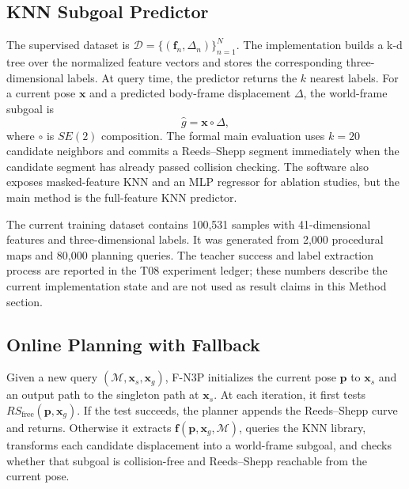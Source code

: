 \documentclass[11pt,a4paper]{article}
\begin{document}
\subsection{KNN Subgoal Predictor}
\label{sec:method_knn}

The supervised dataset is $\mathcal{D}=\{(\mathbf{f}_n,\Delta_n)\}_{n=1}^N$. The implementation builds a k-d tree over the normalized feature vectors and stores the corresponding three-dimensional labels. At query time, the predictor returns the $k$ nearest labels. For a current pose $\mathbf{x}$ and a predicted body-frame displacement $\Delta$, the world-frame subgoal is
\begin{equation}
\hat{g} = \mathbf{x}\circ \Delta,
\end{equation}
where $\circ$ is $SE(2)$ composition. The formal main evaluation uses $k=20$ candidate neighbors and commits a Reeds--Shepp segment immediately when the candidate segment has already passed collision checking. The software also exposes masked-feature KNN and an MLP regressor for ablation studies, but the main method is the full-feature KNN predictor.

The current training dataset contains 100,531 samples with 41-dimensional features and three-dimensional labels. It was generated from 2,000 procedural maps and 80,000 planning queries. The teacher success and label extraction process are reported in the T08 experiment ledger; these numbers describe the current implementation state and are not used as result claims in this Method section.

\subsection{Online Planning with Fallback}
\label{sec:method_online}

Given a new query $(\mathcal{M},\mathbf{x}_s,\mathbf{x}_g)$, F-N3P initializes the current pose $\mathbf{p}$ to $\mathbf{x}_s$ and an output path to the singleton path at $\mathbf{x}_s$. At each iteration, it first tests $RS_{\mathrm{free}}(\mathbf{p},\mathbf{x}_g)$. If the test succeeds, the planner appends the Reeds--Shepp curve and returns. Otherwise it extracts $\mathbf{f}(\mathbf{p},\mathbf{x}_g,\mathcal{M})$, queries the KNN library, transforms each candidate displacement into a world-frame subgoal, and checks whether that subgoal is collision-free and Reeds--Shepp reachable from the current pose.
\end{document}
